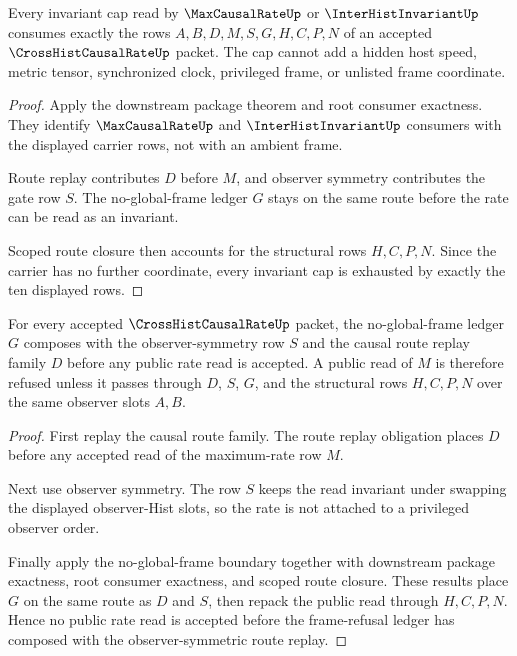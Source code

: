 \begin{theorem}
\label{thm:cross-hist-causal-rate-invariant-cap-exhaustion}
Every invariant cap read by $\MaxCausalRateUp$ or $\InterHistInvariantUp$ consumes exactly the rows $A,B,D,M,S,G,H,C,P,N$ of an accepted $\CrossHistCausalRateUp$ packet. The cap cannot add a hidden host speed, metric tensor, synchronized clock, privileged frame, or unlisted frame coordinate.
\end{theorem}
\begin{proof}
Apply the downstream package theorem and root consumer exactness. They identify $\MaxCausalRateUp$ and $\InterHistInvariantUp$ consumers with the displayed carrier rows, not with an ambient frame.

Route replay contributes $D$ before $M$, and observer symmetry contributes the gate row $S$. The no-global-frame ledger $G$ stays on the same route before the rate can be read as an invariant.

Scoped route closure then accounts for the structural rows $H,C,P,N$. Since the carrier has no further coordinate, every invariant cap is exhausted by exactly the ten displayed rows.
\end{proof}

\begin{theorem}
\label{thm:cross-hist-causal-rate-frame-refusal-composition}
For every accepted $\CrossHistCausalRateUp$ packet, the no-global-frame ledger $G$ composes with the observer-symmetry row $S$ and the causal route replay family $D$ before any public rate read is accepted. A public read of $M$ is therefore refused unless it passes through $D$, $S$, $G$, and the structural rows $H,C,P,N$ over the same observer slots $A,B$.
\end{theorem}
\begin{proof}
First replay the causal route family. The route replay obligation places $D$ before any accepted read of the maximum-rate row $M$.

Next use observer symmetry. The row $S$ keeps the read invariant under swapping the displayed observer-Hist slots, so the rate is not attached to a privileged observer order.

Finally apply the no-global-frame boundary together with downstream package exactness, root consumer exactness, and scoped route closure. These results place $G$ on the same route as $D$ and $S$, then repack the public read through $H,C,P,N$. Hence no public rate read is accepted before the frame-refusal ledger has composed with the observer-symmetric route replay.
\end{proof}

